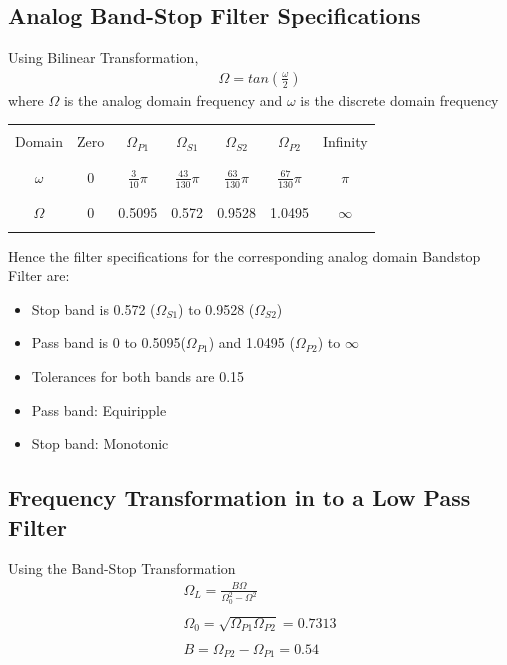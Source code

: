 \documentclass[12pt]{article}
\begin{document}
	\color{cyan}
	\subsection{Analog Band-Stop Filter Specifications}
	\color{black}
	Using Bilinear Transformation,
	\begin{gather*}
		\Omega = tan\left(\frac{\omega}{2}\right)
	\end{gather*}
	where $\Omega$ is the analog domain frequency and $\omega$ is the discrete domain frequency\\
	
	\begin{center}
		\begin{tabular}{ |c|c|c|c|c|c|c| }
			\hline
			&&&&&&\\
			Domain & Zero & $\Omega_{P1}$ & $\Omega_{S1}$ &$\Omega_{S2}$& $\Omega_{P2}$& Infinity\\
			&&&&&&\\
			\hline
			&&&&&&\\
			$\omega$ & 0 & $\frac{3}{10}\pi$ & $\frac{43}{130}\pi$& $\frac{63}{130}\pi$& $\frac{67}{130}\pi$& $\pi$\\
			&&&&&&\\
			\hline
			&&&&&&\\
			$\Omega$ & 0 & 0.5095 & 0.572 & 0.9528 & 1.0495 & $\infty$\\
			&&&&&&\\
			\hline
		\end{tabular}
	\end{center}
	
	\noindent Hence the filter specifications for the corresponding analog domain Bandstop Filter are:
	\begin{itemize}
		\item Stop band is 0.572 ($\Omega_{S1}$)  to 0.9528 ($\Omega_{S2}$) 
		\item Pass band is 0 to 0.5095($\Omega_{P1}$) and 1.0495 ($\Omega_{P2}$) to $\infty$
		\item Tolerances for both bands are 0.15
		\item Pass band: Equiripple
		\item Stop band: Monotonic
	\end{itemize}
	
	\color{cyan}
	\subsection{Frequency Transformation in to a Low Pass Filter}
	\color{black}
	Using the Band-Stop Transformation
	\begin{gather*}
		\Omega_L = \frac{B\Omega}{\Omega_0^2 - \Omega^2}\\\\
		\Omega_0 = \sqrt{\Omega_{P1} \Omega_{P2}} = 0.7313\\\\
		B = \Omega_{P2} - \Omega_{P1} = 0.54
	\end{gather*}
	
\end{document}
